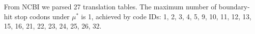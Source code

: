 From NCBI  we parsed 27 translation tables. The maximum number of boundary-hit stop codons under $\mu^\ast$ is 1, achieved by code IDs: 1, 2, 3, 4, 5, 9, 10, 11, 12, 13, 15, 16, 21, 22, 23, 24, 25, 26, 32.
